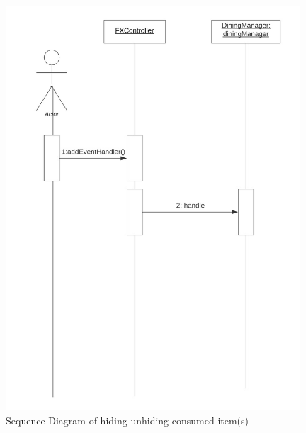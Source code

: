 \documentclass{scrreprt}
\begin{document}
\begin{figure}[!htbp]
\centering
\includegraphics[width=11cm]{pictures/hide-unhide-sd.png}
\caption*{Sequence Diagram of hiding unhiding consumed item(s)}
\end{figure}

\FloatBarrier




\end{document}

